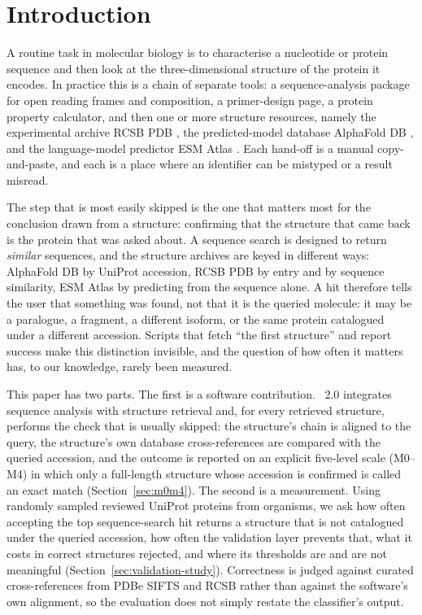 \section{Introduction}
\label{sec:introduction}

A routine task in molecular biology is to characterise a nucleotide or protein
sequence and then look at the three-dimensional structure of the protein it
encodes. In practice this is a chain of separate tools: a sequence-analysis
package for open reading frames and composition, a primer-design page, a protein
property calculator, and then one or more structure resources, namely the
experimental archive RCSB PDB \citep{berman2000pdb}, the predicted-model
database AlphaFold DB \citep{varadi2022alphafolddb,jumper2021alphafold}, and the
language-model predictor ESM Atlas \citep{lin2023esmfold}. Each hand-off is a
manual copy-and-paste, and each is a place where an identifier can be
mistyped or a result misread.

The step that is most easily skipped is the one that matters most for the
conclusion drawn from a structure: confirming that the structure that came back
is the protein that was asked about. A sequence search is designed to return
\emph{similar} sequences, and the structure archives are keyed in different
ways: AlphaFold DB by UniProt accession, RCSB PDB by entry and by sequence
similarity, ESM Atlas by predicting from the sequence alone. A hit therefore
tells the user that something was found, not that it is the queried molecule: it
may be a paralogue, a fragment, a different isoform, or the same protein
catalogued under a different accession. Scripts that fetch ``the first
structure'' and report success make this distinction invisible, and the question
of how often it matters has, to our knowledge, rarely been measured.

This paper has two parts. The first is a software contribution. \bsi\ 2.0
integrates sequence analysis with structure retrieval and, for every retrieved
structure, performs the check that is usually skipped: the structure's chain is
aligned to the query, the structure's own database cross-references are compared
with the queried accession, and the outcome is reported on an explicit five-level
scale (M0--M4) in which only a full-length structure whose accession is confirmed
is called an exact match (Section~\ref{sec:m0m4}). The second is a measurement.
Using  randomly sampled reviewed UniProt proteins from 
organisms, we ask how often accepting the top sequence-search hit returns a
structure that is not catalogued under the queried accession, how often the
validation layer prevents that, what it costs in correct structures rejected,
and where its thresholds are and are not meaningful
(Section~\ref{sec:validation-study}). Correctness is judged against curated
cross-references from PDBe SIFTS and RCSB rather than against the software's own
alignment, so the evaluation does not simply restate the classifier's output.

